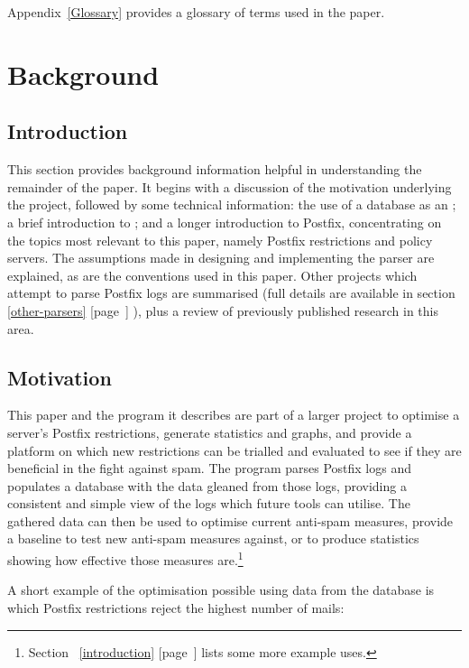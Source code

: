 \documentclass[a4paper,12pt,draft]{article}
\newcommand{\refwithpage}[1]{%
    \empty{}\ref{#1} [page~\pageref{#1}]%
}
\begin{document}
Appendix~\ref{Glossary} provides a glossary of terms used in the paper.

\section{Background}

\label{background}

\subsection{Introduction}

This section provides background information helpful in understanding the
remainder of the paper.  It begins with a discussion of the motivation
underlying the project, followed by some technical information: the use of
a database as an \API\@; a brief introduction to
 \SMTP\@; and a longer introduction to
Postfix, concentrating on the topics most relevant to this paper, namely
Postfix restrictions and policy servers.  The assumptions made in designing
and implementing the parser are explained, as are the conventions used in
this paper.  Other projects which attempt to parse Postfix logs are
summarised (full details are available in
section~\refwithpage{other-parsers}), plus a review of previously published
research in this area.

\subsection{Motivation}

This paper and the program it describes are part of a larger project to
optimise a server's Postfix restrictions, generate statistics and graphs,
and provide a platform on which new restrictions can be trialled and
evaluated to see if they are beneficial in the fight against spam.  The
program parses Postfix logs and populates a database with the data gleaned
from those logs, providing a consistent and simple view of the logs which
future tools can utilise.  The gathered data can then be used to optimise
current anti-spam measures, provide a baseline to test new anti-spam
measures against, or to produce statistics showing how effective those
measures are.\footnote{Section~\refwithpage{introduction} lists some more
example uses.}

A short example of the optimisation possible using data from the database
is which Postfix restrictions reject the highest number of mails:
\end{document}
